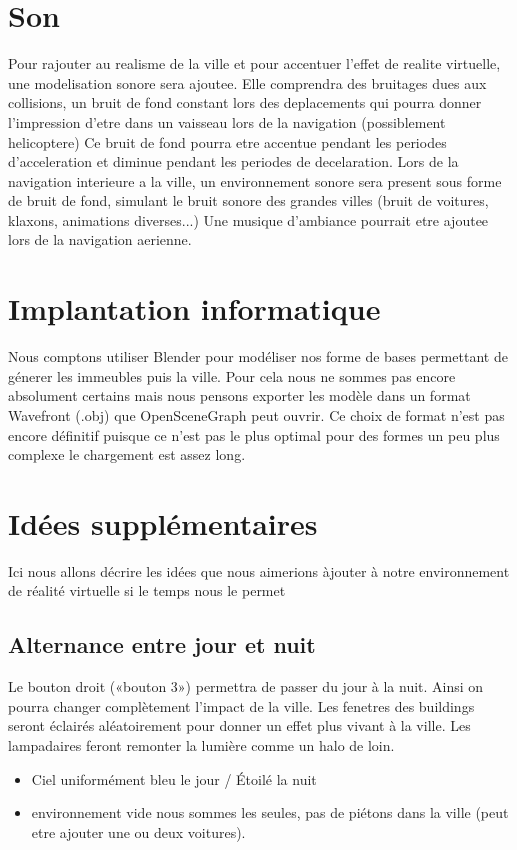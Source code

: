 \documentclass[a4paper,11pt]{article}
\begin{document}
 
\section{Son}
Pour rajouter au realisme de la ville et pour accentuer l'effet de realite virtuelle, une modelisation sonore sera ajoutee. 
Elle comprendra des bruitages dues aux collisions, un bruit de fond constant lors des deplacements qui pourra donner l'impression d'etre dans un vaisseau lors de la navigation (possiblement helicoptere)
Ce bruit de fond pourra etre accentue pendant les periodes d'acceleration et diminue pendant  les periodes de decelaration.
Lors de la navigation interieure a la ville, un environnement sonore sera present sous forme de bruit de fond, simulant le bruit sonore des grandes villes (bruit de voitures, klaxons, animations diverses...)
Une musique d'ambiance pourrait etre ajoutee lors de la navigation aerienne.
 
\section{Implantation informatique}
Nous comptons utiliser Blender pour modéliser nos forme de bases permettant de génerer les immeubles puis la ville. Pour cela nous ne sommes pas encore absolument certains mais nous pensons exporter les modèle dans un format Wavefront (.obj) que OpenSceneGraph peut ouvrir. Ce choix de format n'est pas encore définitif puisque ce n'est pas le plus optimal pour des formes un peu plus complexe le chargement est assez long.

 
\section{Idées supplémentaires}
Ici nous allons décrire les idées que nous aimerions àjouter à notre environnement de réalité virtuelle si le temps nous le permet

\subsection{Alternance entre jour et nuit}
Le bouton droit («bouton 3») permettra de passer du jour à la nuit. Ainsi on pourra changer complètement l'impact de la ville. Les fenetres des buildings seront éclairés aléatoirement pour donner un effet plus vivant à la ville. Les lampadaires feront remonter la lumière comme un halo de loin.
\begin{itemize}
\item Ciel uniformément bleu le jour / Étoilé la nuit
\item environnement vide nous sommes les seules, pas de piétons dans la ville (peut etre ajouter une ou deux voitures).
\end{itemize}
 
\end{document}
